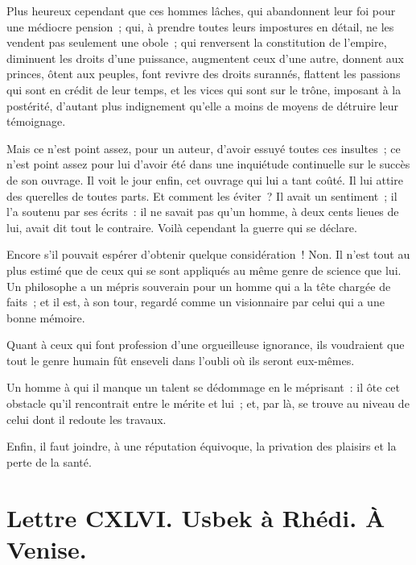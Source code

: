 \documentclass[french,twoside]{book} %
\newcommand{\dateline}[1]{\medskip{\RaggedLeft{#1}\par}\bigskip}
\begin{document}
Plus heureux cependant que ces hommes lâches, qui abandonnent leur foi pour une médiocre pension ; qui, à prendre toutes leurs impostures en détail, ne les vendent pas seulement une obole ; qui renversent la constitution de l’empire, diminuent les droits d’une puissance, augmentent ceux d’une autre, donnent aux princes, ôtent aux peuples, font revivre des droits surannés, flattent les passions qui sont en crédit de leur temps, et les vices qui sont sur le trône, imposant à la postérité, d’autant plus indignement qu’elle a moins de moyens de détruire leur témoignage.\par
Mais ce n’est point assez, pour un auteur, d’avoir essuyé toutes ces insultes ; ce n’est point assez pour lui d’avoir été dans une inquiétude continuelle sur le succès de son ouvrage. Il voit le jour enfin, cet ouvrage qui lui a tant coûté. Il lui attire des querelles de toutes parts. Et comment les éviter ? Il avait un sentiment ; il l’a soutenu par ses écrits : il ne savait pas qu’un homme, à deux cents lieues de lui, avait dit tout le contraire. Voilà cependant la guerre qui se déclare.\par
Encore s’il pouvait espérer d’obtenir quelque considération ! Non. Il n’est tout au plus estimé que de ceux qui se sont appliqués au même genre de science que lui. Un philosophe a un mépris souverain pour un homme qui a la tête chargée de faits ; et il est, à son tour, regardé comme un visionnaire par celui qui a une bonne mémoire.\par
Quant à ceux qui font profession d’une orgueilleuse ignorance, ils voudraient que tout le genre humain fût enseveli dans l’oubli où ils seront eux-mêmes.\par
Un homme à qui il manque un talent se dédommage en le méprisant : il ôte cet obstacle qu’il rencontrait entre le mérite et lui ; et, par là, se trouve au niveau de celui dont il redoute les travaux.\par
Enfin, il faut joindre, à une réputation équivoque, la privation des plaisirs et la perte de la santé.\par

\dateline{De Paris, le 20 de la lune de Chahban 1720.}
\section[{Lettre CXLVI. Usbek à Rhédi. À Venise.}]{Lettre CXLVI. Usbek à Rhédi. À Venise.}\renewcommand{\leftmark}{Lettre CXLVI. Usbek à Rhédi. À Venise.}
\end{document}
